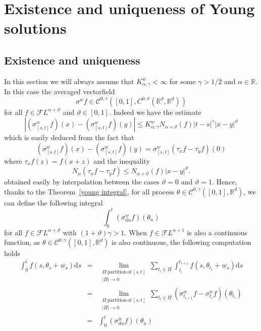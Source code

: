 \documentclass[11pt,a4paper,draft,reqno]{amsart}
\theoremstyle{definition}
\newcommand{\RR}{\mathbb{R}}
\newcommand{\cF}{\mathcal{F}}
\newcommand{\dd}{\mathrm{d}}
\newcommand{\cC}{\mathcal{C}}
\begin{document}
\section{Existence and uniqueness of Young solutions}
\label{sec:existence-uniqueness-young}
\subsection{Existence and uniqueness}
%
In this section we will always assume that  $K^w_{\alpha,\gamma}<\infty$ for some $\gamma> 1/2$ and $\alpha \in \RR$. In this case the averaged vectorfield $$\sigma^w f \in \cC^{0,\gamma}([0,1], C^{0,\vartheta}(\RR^d,\RR^d))$$ for all $f\in \cF L^{\alpha+\vartheta}$ and $\vartheta\in[0,1]$. Indeed we have the estimate
\begin{equation}
\label{eq:sigma-bound-2}
|(\sigma^w_{[s,t]} f)(x)-(\sigma^w_{[s,t]} f)(y)| \le K^w_{\alpha,\gamma} N_{\alpha+\vartheta}(f) |t-s|^\gamma |x-y|^\vartheta
\end{equation}
which is easily deduced from the fact that
$$
(\sigma^w_{[s,t]} f)(x)-(\sigma^w_{[s,t]} f)(y) = \sigma^w_{[s,t]}(\tau_x f - \tau_y f)(0)
$$
where $\tau_x f(z) = f(x+z)$ and the inequality
$$
N_\alpha(\tau_x f - \tau_y f) \le N_{\alpha+\vartheta}(f)|x-y|^\vartheta.
$$ 
obtained easily by interpolation between the cases $\vartheta=0$ and $\vartheta=1$. 
Hence, thanks to the Theorem~\ref{young integral}, for all process $\theta\in\cC^{0,\gamma}([0,1],\RR^d)$, we can define the following integral
$$\int_0^t\left(\sigma^w_{\dd u}f\right)(\theta_u)$$ for all $f\in \cF L^{\alpha+\vartheta}$ with $(1+\vartheta)\gamma > 1$.
When $f\in\cF L^{\alpha+1}$ is also a continuous function, as $\theta\in\cC^{0,\gamma}([0,1],\RR^d)$ is also continuous, the following computation holds
\begin{eqnarray*}
\int_0^t f(s,\theta_s + w_s)\dd s
& = & 
\lim_{\substack{\Pi \mathrm{\ partition\ of}\ [s,t]\\ |\Pi|\to 0}} \sum_{t_i\in\Pi}\int_{t_i}^{t_{i+1}}f(s,\theta_{t_i}+w_s)\dd s\\
& = & 
\lim_{\substack{\Pi \mathrm{\ partition\ of}\ [s,t]\\ |\Pi|\to 0}} \sum_{t_i\in\Pi}\left(\sigma^w_{t_{i+1}}f-\sigma^w_{t_{i}}f\right)(\theta_{t_i})\\
& = &
\int_0^t\left(\sigma^w_{\dd u}f\right)(\theta_u)
\end{eqnarray*}
\end{document}
